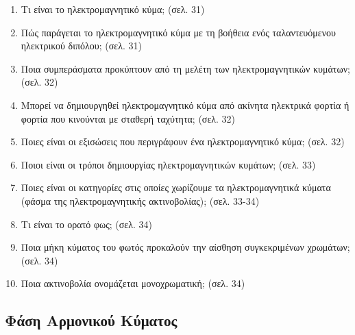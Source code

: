 \documentclass{article}
\begin{document}
\begin{enumerate}
      \item Τι είναι το ηλεκτρομαγνητικό κύμα; (σελ. 31)

      \item Πώς παράγεται το ηλεκτρομαγνητικό κύμα με τη βοήθεια ενός ταλαντευόμενου ηλεκτρικού διπόλου; (σελ. 31)

      \item Ποια συμπεράσματα προκύπτουν από τη μελέτη των ηλεκτρομαγνητικών κυμάτων; (σελ. 32)

      \item Μπορεί να δημιουργηθεί ηλεκτρομαγνητικό κύμα από ακίνητα ηλεκτρικά φορτία ή φορτία που κινούνται με σταθερή ταχύτητα; (σελ. 32)

      \item Ποιες είναι οι εξισώσεις που περιγράφουν ένα ηλεκτρομαγνητικό κύμα; (σελ. 32)

      \item Ποιοι είναι οι τρόποι δημιουργίας ηλεκτρομαγνητικών κυμάτων; (σελ. 33)

      \item Ποιες είναι οι κατηγορίες στις οποίες χωρίζουμε τα ηλεκτρομαγνητικά κύματα (φάσμα της ηλεκτρομαγνητικής ακτινοβολίας); (σελ. 33-34)

      \item Τι είναι το ορατό φως; (σελ. 34)

      \item Ποια μήκη κύματος του φωτός προκαλούν την αίσθηση συγκεκριμένων χρωμάτων; (σελ. 34)

      \item Ποια ακτινοβολία ονομάζεται μονοχρωματική; (σελ. 34)
\end{enumerate}

\subsection{Φάση Αρμονικού Κύματος}
\end{document}
